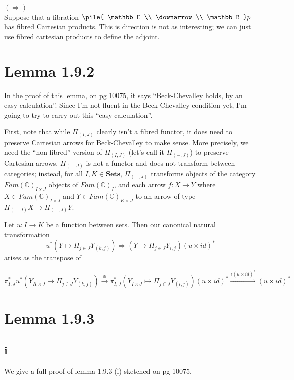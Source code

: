 \documentclass{article}
\newcommand{\mbf}{\mathbf}
\newcommand{\vrt}[2]{
\pile{
#1 \\
\downarrow \\
#2
}
}
\begin{document}
$(\Rightarrow)$~\\ 

Suppose that a fibration $\vrt{\mathbb E}{\mathbb B}p$ has fibred Cartesian products. 
This is direction is not as interesting; we can just use fibred cartesian products to define the adjoint.
 
\section*{Lemma 1.9.2}

In the proof of this lemma, on pg 10075, it says ``Beck-Chevalley holds, by an easy calculation''.
Since I'm not fluent in the Beck-Chevalley condition yet, I'm going to try to carry out this ``easy calculation''.

First, note that while $\Pi_{(I,J)}$ clearly isn't a fibred functor, it does need to preserve Cartesian arrows
for Beck-Chevalley to make sense. More precisely, we need the ``non-fibred'' version of $\Pi_{(I,J)}$ (let's
call it $\Pi_{(-,J)}$) to preserve Cartesian arrows. $\Pi_{(-,J)}$ is not a functor and does not transform between categories;
instead, for all $I,K \in \mbf{Sets}$,  $\Pi_{(-,J)}$ transforms objects of the category $Fam(\mathbb C)_{I \times J}$ 
objects of $Fam(\mathbb C)_{I}$, and each arrow $f : X \to Y$ where $X \in Fam(\mathbb C)_{I \times J}$ and $Y \in Fam(\mathbb C)_{K \times J}$ to an arrow of type $\Pi_{(-,J)} X \to \Pi_{(-,J)} Y$. 

Let $u : I \to K$ be a function between sets. Then our canonical natural transformation 
$$u^* (Y \mapsto \Pi_{j \in J} Y_{(k,j)}) \Longrightarrow (Y \mapsto \Pi_{j \in J} Y_{i,j}) (u \times id)^*$$
arises as the transpose of

$$\pi^*_{I,J} u^* (Y_{K \times J} \mapsto \Pi_{j \in J} Y_{(k,j)}) \overset{\cong}{\longrightarrow} \pi^*_{I,J} (Y_{I \times J} \mapsto \Pi_{j \in J} Y_{(i,j)}) (u \times id)^* \overset{\epsilon (u \times id)^*}{\longrightarrow} (u \times id)^*$$


\section*{Lemma 1.9.3}

\subsection*{i}
We give a full proof of lemma 1.9.3 (i) sketched on pg 10075.\\~\\
\end{document}
